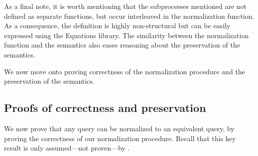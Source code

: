 As a final note, it is worth mentioning that the subprocesses mentioned are not defined as separate functions, but occur interleaved in the normalization function. As a consequence, the definition is highly non-structural but can be easily expressed using the Equations library. The  similarity between the normalization function and the semantics also eases reasoning about the preservation of the semantics. 

We now move onto proving correctness of the normalization procedure and the preservation of the semantics.



\subsection{Proofs of correctness and preservation}


We now prove that any query can be normalized to an equivalent query, by 
proving the correctness of our normalization procedure. Recall that this key result is only assumed---not proven---by \HP.

